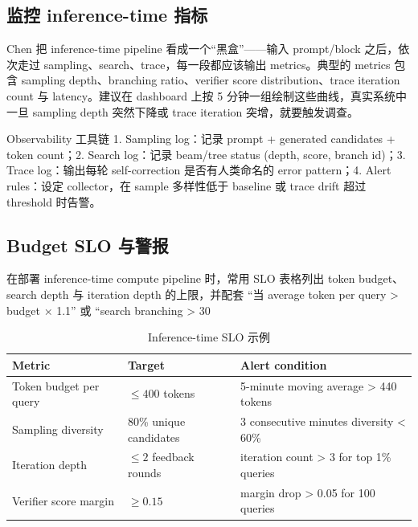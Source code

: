 \documentclass[a4paper]{article}
\begin{document}
\subsection{监控 inference-time 指标}
Chen 把 inference-time pipeline 看成一个“黑盒”——输入 prompt/block 之后，依次走过 sampling、search、trace，每一段都应该输出 metrics。典型的 metrics 包含 sampling depth、branching ratio、verifier score distribution、trace iteration count 与 latency。建议在 dashboard 上按 5 分钟一组绘制这些曲线，真实系统中一旦 sampling depth 突然下降或 trace iteration 突增，就要触发调查。

\begin{knowledgebox}{Observability 工具链}
1. Sampling log：记录 prompt + generated candidates + token count；2. Search log：记录 beam/tree status (depth, score, branch id)；3. Trace log：输出每轮 self-correction 是否有人类命名的 error pattern；4. Alert rules：设定 collector，在 sample 多样性低于 baseline 或 trace drift 超过 threshold 时告警。
\end{knowledgebox}

\subsection{Budget SLO 与警报}
在部署 inference-time compute pipeline 时，常用 SLO 表格列出 token budget、search depth 与 iteration depth 的上限，并配套 “当 average token per query > budget × 1.1” 或 “search branching > 30%

\begin{table}[H]
\centering
\caption{Inference-time SLO 示例}
\begin{tabular}{p{}p{}p{}}
\toprule
Metric & Target & Alert condition \\
\midrule
Token budget per query & $\leq 400$ tokens & 5-minute moving average > 440 tokens \\
Sampling diversity & 80\% unique candidates & 3 consecutive minutes diversity < 60\% \\
Iteration depth & $\leq 2$ feedback rounds & iteration count > 3 for top 1\% queries \\
Verifier score margin & $\geq 0.15$ & margin drop > 0.05 for 100 queries \\
\bottomrule
\end{tabular}
\end{table}
\end{document}
